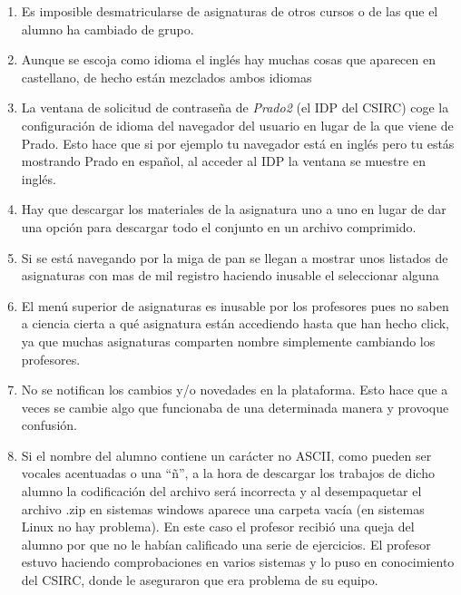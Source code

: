 \begin{enumerate}

\item Es imposible desmatricularse de asignaturas de otros cursos o de las que el alumno ha cambiado de grupo.

\item Aunque se escoja como idioma el inglés hay muchas cosas que aparecen en castellano, de hecho están mezclados ambos idiomas

\item La ventana de solicitud de contraseña de \textit{Prado2} (el IDP del CSIRC) coge la configuración de idioma del navegador del usuario en lugar de la que viene de Prado. Esto hace que si por ejemplo tu navegador está en inglés pero tu estás mostrando Prado en español, al acceder al IDP la ventana se muestre en inglés.

\item Hay que descargar los materiales de la asignatura uno a uno en lugar de dar una opción para descargar todo el conjunto en un archivo comprimido.

\item Si se está navegando por la miga de pan se llegan a mostrar unos listados de asignaturas con mas de mil registro haciendo inusable el seleccionar alguna

\item El menú superior de asignaturas es inusable por los profesores pues no saben a ciencia cierta a qué asignatura están accediendo hasta que han hecho click, ya que muchas asignaturas comparten nombre simplemente cambiando los profesores.

\item No se notifican los cambios y/o novedades en la plataforma. Esto hace que a veces se cambie algo que funcionaba de una determinada manera y provoque confusión.

\item Si el nombre del alumno contiene un carácter no ASCII, como pueden ser vocales acentuadas o una ``ñ'', a la hora de descargar los trabajos de dicho alumno la codificación del archivo será incorrecta y al desempaquetar el archivo .zip en sistemas windows aparece una carpeta vacía (en sistemas Linux no hay problema). En este caso el profesor recibió una queja del alumno por que no le habían calificado una serie de ejercicios. El profesor estuvo haciendo comprobaciones en varios sistemas y lo puso en conocimiento del CSIRC, donde le aseguraron que era problema de su equipo.


\end{enumerate}
